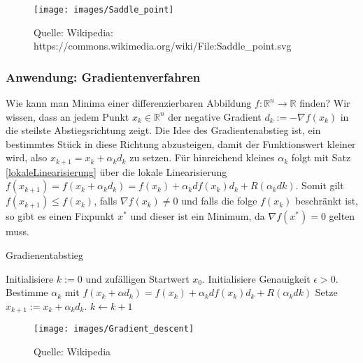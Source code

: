 \begin{figure}[H]
      \centering
    \texttt{[image: images/Saddle\_point]}
      \caption{Quelle: Wikipedia: https://commons.wikimedia.org/wiki/File:Saddle\_point.svg}

\end{figure}



\subsubsection*{Anwendung: Gradientenverfahren} 
Wie kann man Minima einer  differenzierbaren Abbildung $f: \mathbb{R}^n \to \mathbb{R}$ finden? 
Wir wissen, dass an jedem Punkt $x_k \in  \mathbb{R}^n$ der negative Gradient  $d_k := -\nabla f (x_k)$ in die steilste Abstiegsrichtung zeigt.
Die Idee des Gradientenabstieg ist, ein bestimmtes  Stück in diese Richtung abzusteigen, damit der Funktionswert kleiner wird, also $x_{k+1} = x_k + \alpha_k d_k$ zu setzen. Für hinreichend kleines $\alpha_k$ folgt mit Satz \ref{lokaleLinearisierung} über die lokale Linearisierung  
$f(x_{k+1}) = f (x_k + \alpha_k d_k) =  f(x_k) + \alpha_k df(x_k)d_k + R( \alpha_k dk)$.  Somit gilt $f(x_{k+1}) \leq f(x_k)$, falls $\nabla f(x_k) \neq 0$ und falls die folge $f(x_k)$ beschränkt ist, so gibt es einen Fixpunkt $x^*$ und dieser ist ein Minimum, da $\nabla f(x^*) = 0$ gelten muss.  

\begin{algorithm}
\caption{Gradienentabstieg}
\begin{algorithmic}[1]


    \State Initialisiere $k:=0$ und zufälligen Startwert $x_0$.
\State Initialisiere Genauigkeit $\epsilon > 0$.
      
        \State Bestimme $\alpha_k$  mit $f (x_k + \alpha d_k) =  f(x_k) + \alpha_k df(x_k)d_k + R( \alpha_k dk)$ 
        \State Setze $x_{k+1} := x_k  + \alpha_k d_k$. 
 	\State  $k \leftarrow k+1$ 
    \EndWhile  \label{Gradientenverfahren}


\end{algorithmic}
\end{algorithm}

\begin{figure}[H]
      \centering
    \texttt{[image: images/Gradient\_descent]}
      \caption{Quelle: Wikipedia}
\end{figure}



